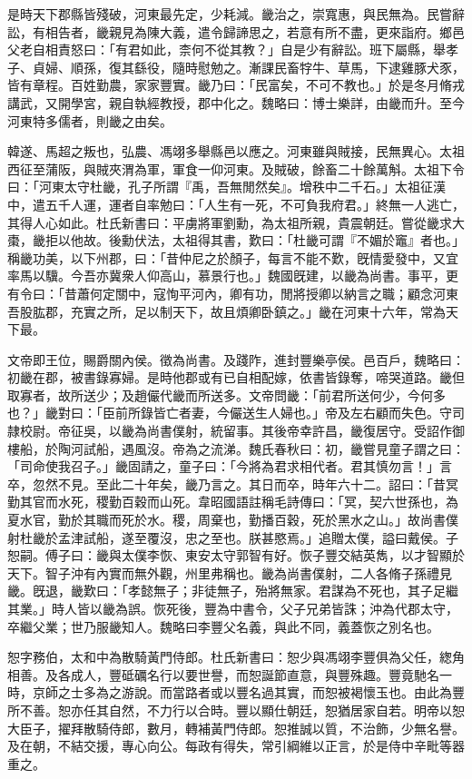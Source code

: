 \begin{pinyinscope}
是時天下郡縣皆殘破，河東最先定，少耗減。畿治之，崇寬惠，與民無為。民嘗辭訟，有相告者，畿親見為陳大義，遣令歸諦思之，若意有所不盡，更來詣府。鄉邑父老自相責怒曰：「有君如此，柰何不從其教？」自是少有辭訟。班下屬縣，舉孝子、貞婦、順孫，復其繇役，隨時慰勉之。漸課民畜牸牛、草馬，下逮雞豚犬豕，皆有章程。百姓勤農，家家豐實。畿乃曰：「民富矣，不可不教也。」於是冬月脩戎講武，又開學宮，親自執經教授，郡中化之。魏略曰：博士樂詳，由畿而升。至今河東特多儒者，則畿之由矣。

韓遂、馬超之叛也，弘農、馮翊多舉縣邑以應之。河東雖與賊接，民無異心。太祖西征至蒲阪，與賊夾渭為軍，軍食一仰河東。及賊破，餘畜二十餘萬斛。太祖下令曰：「河東太守杜畿，孔子所謂『禹，吾無閒然矣』。增秩中二千石。」太祖征漢中，遣五千人運，運者自率勉曰：「人生有一死，不可負我府君。」終無一人逃亡，其得人心如此。杜氏新書曰：平虜將軍劉勳，為太祖所親，貴震朝廷。嘗從畿求大棗，畿拒以他故。後勳伏法，太祖得其書，歎曰：「杜畿可謂『不媚於竈』者也。」稱畿功美，以下州郡，曰：「昔仲尼之於顏子，每言不能不歎，旣情愛發中，又宜率馬以驥。今吾亦冀衆人仰高山，慕景行也。」魏國旣建，以畿為尚書。事平，更有令曰：「昔蕭何定關中，寇恂平河內，卿有功，閒將授卿以納言之職；顧念河東吾股肱郡，充實之所，足以制天下，故且煩卿卧鎮之。」畿在河東十六年，常為天下最。

文帝即王位，賜爵關內侯。徵為尚書。及踐阼，進封豐樂亭侯。邑百戶，魏略曰：初畿在郡，被書錄寡婦。是時他郡或有已自相配嫁，依書皆錄奪，啼哭道路。畿但取寡者，故所送少；及趙儼代畿而所送多。文帝問畿：「前君所送何少，今何多也？」畿對曰：「臣前所錄皆亡者妻，今儼送生人婦也。」帝及左右顧而失色。守司隷校尉。帝征吳，以畿為尚書僕射，統留事。其後帝幸許昌，畿復居守。受詔作御樓船，於陶河試船，遇風沒。帝為之流涕。魏氏春秋曰：初，畿嘗見童子謂之曰：「司命使我召子。」畿固請之，童子曰：「今將為君求相代者。君其慎勿言！」言卒，忽然不見。至此二十年矣，畿乃言之。其日而卒，時年六十二。詔曰：「昔冥勤其官而水死，稷勤百穀而山死。韋昭國語註稱毛詩傳曰：「冥，契六世孫也，為夏水官，勤於其職而死於水。稷，周棄也，勤播百穀，死於黑水之山。」故尚書僕射杜畿於孟津試船，遂至覆沒，忠之至也。朕甚愍焉。」追贈太僕，謚曰戴侯。子恕嗣。傅子曰：畿與太僕李恢、東安太守郭智有好。恢子豐交結英雋，以才智顯於天下。智子沖有內實而無外觀，州里弗稱也。畿為尚書僕射，二人各脩子孫禮見畿。旣退，畿歎曰：「孝懿無子；非徒無子，殆將無家。君謀為不死也，其子足繼其業。」時人皆以畿為誤。恢死後，豐為中書令，父子兄弟皆誅；沖為代郡太守，卒繼父業；世乃服畿知人。魏略曰李豐父名義，與此不同，義蓋恢之別名也。

恕字務伯，太和中為散騎黃門侍郎。杜氏新書曰：恕少與馮翊李豐俱為父任，緫角相善。及各成人，豐砥礪名行以要世譽，而恕誕節直意，與豐殊趣。豐竟馳名一時，京師之士多為之游說。而當路者或以豐名過其實，而恕被褐懷玉也。由此為豐所不善。恕亦任其自然，不力行以合時。豐以顯仕朝廷，恕猶居家自若。明帝以恕大臣子，擢拜散騎侍郎，數月，轉補黃門侍郎。恕推誠以質，不治飾，少無名譽。及在朝，不結交援，專心向公。每政有得失，常引綱維以正言，於是侍中辛毗等器重之。


\end{pinyinscope}
